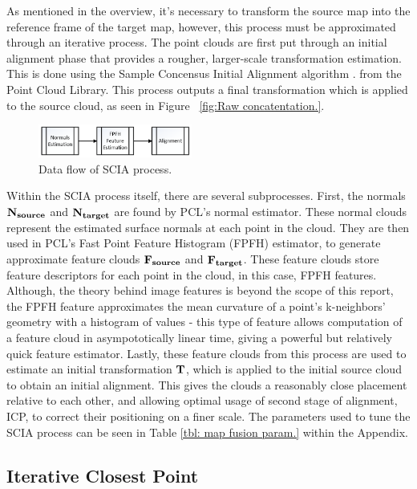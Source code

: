 \documentclass[letterpaper, oneside, 10pt]{report}
\begin{document}
    \noindent As mentioned in the overview, it's necessary to transform the source map into the reference frame of the target map, however, this process must be approximated through an iterative process. The point clouds are first put through an initial alignment phase that provides a rougher, larger-scale transformation estimation. This is done using the Sample Concensus Initial Alignment algorithm \cite{rusu2009fast}. from the Point Cloud Library. This process outputs a final transformation which is applied to the source cloud, as seen in Figure ~\ref{fig:Raw concatentation.}.

    \begin{figure}[h]
     \caption{Data flow of SCIA process.}
     \centering
       \includegraphics[width=0.45\textwidth]{images/initialalignment}
    \end{figure}

    \noindent Within the SCIA process itself, there are several subprocesses. First, the normals $\bf{N_{source}}$ and $\bf{N_{target}}$ are found by PCL's normal estimator. These normal clouds represent the estimated surface normals at each point in the cloud. They are then used in PCL's Fast Point Feature Histogram (FPFH) \cite{rusu2009fast,rusu2009fastlabel} estimator, to generate approximate feature clouds $\bf{F_{source}}$ and $\bf{F_{target}}$. These feature clouds store feature descriptors for each point in the cloud, in this case, FPFH features. Although, the theory behind image features is beyond the scope of this report, the FPFH feature approximates the mean curvature of a point's k-neighbors' geometry with a histogram of values - this type of feature allows computation of a feature cloud in asympototically linear time, giving a powerful but relatively quick feature estimator. Lastly, these feature clouds from this process are used to estimate an initial transformation $\bf{T}$, which is applied to the initial source cloud to obtain an initial alignment. This gives the clouds a reasonably close placement relative to each other, and allowing optimal usage of second stage of alignment, ICP, to correct their positioning on a finer scale. The parameters used to tune the SCIA process can be seen in Table \ref{tbl: map fusion param.} within the Appendix.

    \subsection{Iterative Closest Point}
\end{document}
